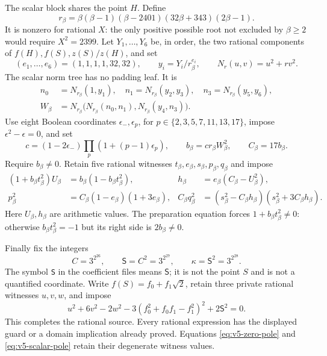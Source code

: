 \documentclass[11pt]{article}
\theoremstyle{definition}
\theoremstyle{remark}
\begin{document}
The scalar block shares the point $H$. Define
\[
 r_\beta=\beta(\beta-1)(\beta-2401)(32\beta+343)(2\beta-1).
\]
It is nonzero for rational $X$: the only positive possible root not
excluded by $\beta\ge2$ would require $X^2=2399$.
Let $Y_1,\ldots,Y_6$ be, in order, the two rational components of
$f(H),f(S),z(S)/z(H)$, and set
\[
 (e_1,\ldots,e_6)=(1,1,1,1,32,32),\qquad
 y_i=Y_i/r_\beta^{e_i},\qquad N_r(u,v)=u^2+rv^2.
\]
The scalar norm tree has no padding leaf. It is
\begin{equation}\label{eq:v5-scalar-tree}
 \begin{aligned}
 n_0&=N_{r_\beta}(1,y_1),\quad n_1=N_{r_\beta}(y_2,y_3),\quad
 n_3=N_{r_\beta}(y_5,y_6),\\
 W_\beta&=N_{r_\beta}\bigl(N_{r_\beta}(n_0,n_1),
                          N_{r_\beta}(y_4,n_3)\bigr).
 \end{aligned}
\end{equation}
Use eight Boolean coordinates $\epsilon_-,\epsilon_p$, for
$p\in\{2,3,5,7,11,13,17\}$, impose $\epsilon^2-\epsilon=0$, and set
\[
 c=(1-2\epsilon_-)\prod_p(1+(p-1)\epsilon_p),\qquad
 b_\beta=c r_\beta W_\beta^2,\qquad C_\beta=17b_\beta.
\]
Require $b_\beta\ne0$. Retain five rational witnesses
$t_\beta,e_\beta,s_\beta,p_\beta,q_\beta$ and impose
\begin{align}
 (1+b_\beta t_\beta^2)U_\beta
    &=b_\beta(1-b_\beta t_\beta^2),
 &h_\beta&=e_\beta(C_\beta-U_\beta^2),\label{eq:v5-scalar-preparation}\\
 p_\beta^2&=C_\beta(1-e_\beta)(1+3e_\beta),
 &C_\beta q_\beta^2&=(s_\beta^2-C_\beta h_\beta)
                     (s_\beta^2+3C_\beta h_\beta).
 \label{eq:v5-scalar-pole}
\end{align}
Here $U_\beta,h_\beta$ are arithmetic values. The preparation equation
forces $1+b_\beta t_\beta^2\ne0$: otherwise $b_\beta t_\beta^2=-1$
but its right side is $2b_\beta\ne0$.

Finally fix the integers
\begin{equation}\label{eq:v5-fixed-constant}
 C=3^{2^{26}},\qquad \mathsf S=C^2=3^{2^{27}},\qquad
 \kappa=\mathsf S^2=3^{2^{28}}.
\end{equation}
The symbol \texttt{S} in the coefficient files means $\mathsf S$;
it is not the point $S$ and is not a quantified coordinate.
Write $f(S)=f_0+f_1\sqrt2$, retain three private rational witnesses
$u,v,w$, and impose
\begin{equation}\label{eq:v5-physical-anchor}
 u^2+6v^2-2w^2-3(f_0^2+f_0f_1-f_1^2)^2+2\mathsf S^2=0.
\end{equation}
This completes the rational source. Every rational expression has the
displayed guard or a domain implication already proved. Equations
\eqref{eq:v5-zero-pole} and \eqref{eq:v5-scalar-pole} retain their
degenerate witness values.
\end{document}
